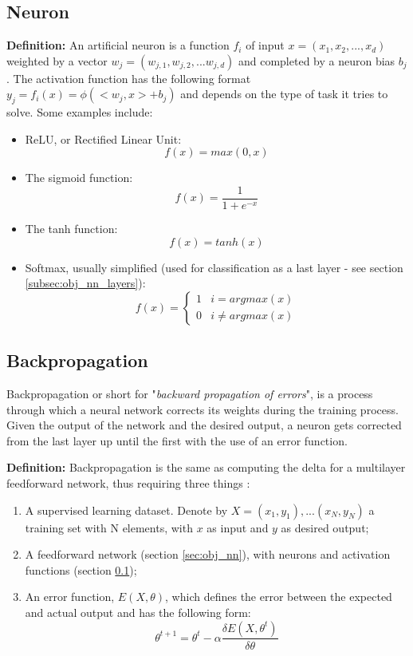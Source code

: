 \subsection{Neuron}
\label{subsec:obj_nn_neuron}

\qquad \textbf{Definition:} An artificial neuron is a function $f_i$ of input $x = (x_1, x_2, ... , x_d)$ weighted by a vector $w_j = (w_{j,1}, w_{j,2}, ... w_{j,d})$ and completed by a neuron bias $b_j$. The activation function has the following format $y_j = f_i(x) = \phi(< w_j, x > + b_j)$ \cite{backpropagation} and depends on the type of task it tries to solve. Some examples include:

\begin{itemize}
\item{ReLU, or Rectified Linear Unit: \[ f(x) = max(0, x) \]}
\item{The sigmoid function: \[ f(x) = \frac{1}{1 + e^{-x}} \]} 
\item{The tanh function: \[ f(x) = tanh(x) \]}
\item{Softmax, usually simplified (used for classification as a last layer - see section \ref{subsec:obj_nn_layers}): 
\[ f(x) = 
	\begin{cases} 
		1 & i = argmax(x) \\
		0 & i \neq argmax(x)
	\end{cases}
\]}
\end{itemize}

\subsection{Backpropagation}
\label{subsec:obj_nn_backpropagation}

\qquad Backpropagation or short for "\textit{backward propagation of errors}", is a process through which a neural network corrects its weights during the training process. Given the output of the network and the desired output, a neuron gets corrected from the last layer up until the first with the use of an error function.

\qquad \textbf{Definition:} Backpropagation is the same as computing the delta for a multilayer feedforward network, thus requiring three things \cite{brilliant:backpropagation}:  

\begin{enumerate}
\item{A supervised learning dataset. Denote by $X = (x_1, y_1), ... (x_N, y_N)$ a training set with N elements, with $x$ as input and $y$ as desired output;}
\item{A feedforward network (section \ref{sec:obj_nn}), with neurons and activation functions (section \ref{subsec:obj_nn_neuron});}
\item{An error function, $E(X, \theta)$, which defines the error between the expected and actual output and has the following form: \[ \theta^{t+1} = \theta^t - \alpha \frac{\delta E(X, \theta^t)}{\delta \theta} \]}
\end{enumerate}

